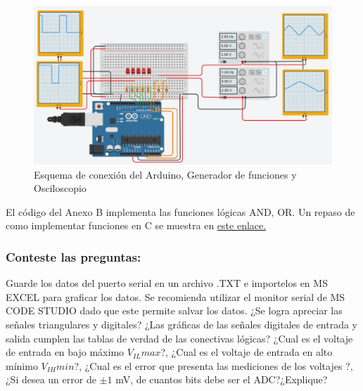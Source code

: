 \begin{figure}[H]
	\centering
	\includegraphics[width=0.8\linewidth]{fig/Fig2.png}
	\caption{Esquema de conexión del Arduino, Generador de funciones y Osciloscopio}
	\label{fig:fig2}
\end{figure}


El código del Anexo B implementa las funciones lógicas AND, OR. Un repaso de como implementar funciones en C se muestra en \href{https://aprendiendoarduino.wordpress.com/2016/11/16/funciones-definidas-por-usuario-2/}{este enlace.} 

\subsubsection{Conteste las preguntas:}

Guarde los datos del puerto serial en un archivo .TXT e importelos en MS EXCEL para graficar los datos.
Se recomienda utilizar el monitor serial de MS CODE STUDIO dado que este permite salvar los datos.
¿Se logra apreciar las señales triangulares y digitales?
¿Las gráficas de las señales digitales de entrada y salida cumplen las tablas de verdad de las conectivas lógicas?
¿Cual es el voltaje de entrada en bajo máximo $V_{IL} max$?,
¿Cual es el voltaje de entrada en alto mínimo $V_{IH} min$?,
¿Cual es el error que presenta las mediciones de los voltajes ?,
¿Si desea un error de $\pm1$ mV, de cuantos bits debe ser el ADC?¿Explique?